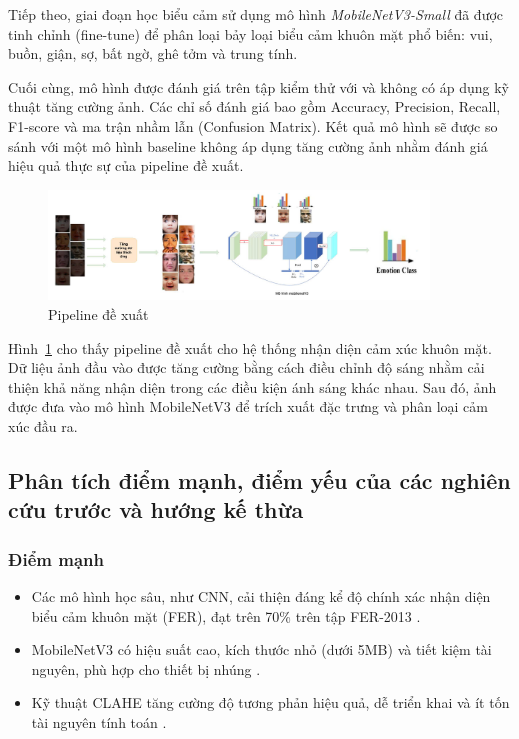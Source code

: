 Tiếp theo, giai đoạn học biểu cảm sử dụng mô hình \textit{MobileNetV3-Small} đã được tinh chỉnh (fine-tune) để phân loại bảy loại biểu cảm khuôn mặt phổ biến: vui, buồn, giận, sợ, bất ngờ, ghê tởm và trung tính.

Cuối cùng, mô hình được đánh giá trên tập kiểm thử với và không có áp dụng kỹ thuật tăng cường ảnh. Các chỉ số đánh giá bao gồm Accuracy, Precision, Recall, F1-score và ma trận nhầm lẫn (Confusion Matrix). Kết quả mô hình sẽ được so sánh với một mô hình baseline không áp dụng tăng cường ảnh nhằm đánh giá hiệu quả thực sự của pipeline đề xuất.


\begin{figure}[H]
    \centering
    \includegraphics[width=0.9\textwidth]{img/pineline.jpg} %
    \caption{Pipeline đề xuất}
    \label{fig:pineline}
\end{figure}

Hình~\ref{fig:pineline} cho thấy pipeline đề xuất cho hệ thống nhận diện cảm xúc khuôn mặt. Dữ liệu ảnh đầu vào được tăng cường bằng cách điều chỉnh độ sáng nhằm cải thiện khả năng nhận diện trong các điều kiện ánh sáng khác nhau. Sau đó, ảnh được đưa vào mô hình MobileNetV3 để trích xuất đặc trưng và phân loại cảm xúc đầu ra.

\subsection{Phân tích điểm mạnh, điểm yếu của các nghiên cứu trước và hướng kế thừa}

\subsubsection{Điểm mạnh}
\begin{itemize}
    \item Các mô hình học sâu, như CNN, cải thiện đáng kể độ chính xác nhận diện biểu cảm khuôn mặt (FER), đạt trên 70\% trên tập FER-2013 \cite{mollahosseini2016}.
    \item MobileNetV3 có hiệu suất cao, kích thước nhỏ (dưới 5MB) và tiết kiệm tài nguyên, phù hợp cho thiết bị nhúng \cite{howard2019, sandler2018}.
    \item Kỹ thuật CLAHE tăng cường độ tương phản hiệu quả, dễ triển khai và ít tốn tài nguyên tính toán \cite{wang2020}.
\end{itemize}

